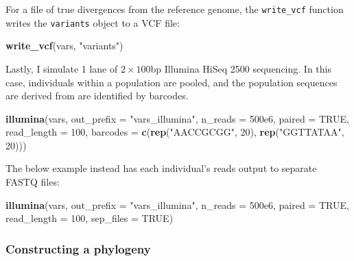 \documentclass[12pt,]{article}
\newenvironment{Shaded}{\begin{snugshade}}{\end{snugshade}}
\newcommand{\DataTypeTok}[1]{\textcolor[rgb]{0.13,0.29,0.53}{#1}}
\newcommand{\DecValTok}[1]{\textcolor[rgb]{0.00,0.00,0.81}{#1}}
\newcommand{\FloatTok}[1]{\textcolor[rgb]{0.00,0.00,0.81}{#1}}
\newcommand{\KeywordTok}[1]{\textcolor[rgb]{0.13,0.29,0.53}{\textbf{#1}}}
\newcommand{\NormalTok}[1]{#1}
\newcommand{\OtherTok}[1]{\textcolor[rgb]{0.56,0.35,0.01}{#1}}
\newcommand{\StringTok}[1]{\textcolor[rgb]{0.31,0.60,0.02}{#1}}
\begin{document}
For a file of true divergences from the reference genome, the \texttt{write\_vcf} function
writes the \texttt{variants} object to a VCF file:

\begin{Shaded}
\begin{Highlighting}[]
\KeywordTok{write_vcf}\NormalTok{(vars, }\StringTok{"variants"}\NormalTok{)}
\end{Highlighting}
\end{Shaded}

Lastly, I simulate 1 lane of \(2 \times 100\)bp Illumina HiSeq 2500 sequencing.
In this case, individuals within a population are pooled, and the population
sequences are derived from are identified by barcodes.

\begin{Shaded}
\begin{Highlighting}[]
\KeywordTok{illumina}\NormalTok{(vars, }\DataTypeTok{out_prefix =} \StringTok{"vars_illumina"}\NormalTok{,}
         \DataTypeTok{n_reads =} \FloatTok{500e6}\NormalTok{, }\DataTypeTok{paired =} \OtherTok{TRUE}\NormalTok{,}
         \DataTypeTok{read_length =} \DecValTok{100}\NormalTok{,}
         \DataTypeTok{barcodes =} \KeywordTok{c}\NormalTok{(}\KeywordTok{rep}\NormalTok{(}\StringTok{"AACCGCGG"}\NormalTok{, }\DecValTok{20}\NormalTok{),}
                      \KeywordTok{rep}\NormalTok{(}\StringTok{"GGTTATAA"}\NormalTok{, }\DecValTok{20}\NormalTok{)))}
\end{Highlighting}
\end{Shaded}

The below example instead has each individual's reads output to separate FASTQ files:

\begin{Shaded}
\begin{Highlighting}[]
\KeywordTok{illumina}\NormalTok{(vars, }\DataTypeTok{out_prefix =} \StringTok{"vars_illumina"}\NormalTok{,}
         \DataTypeTok{n_reads =} \FloatTok{500e6}\NormalTok{, }\DataTypeTok{paired =} \OtherTok{TRUE}\NormalTok{,}
         \DataTypeTok{read_length =} \DecValTok{100}\NormalTok{,}
         \DataTypeTok{sep_files =} \OtherTok{TRUE}\NormalTok{)}
\end{Highlighting}
\end{Shaded}

\hypertarget{constructing-a-phylogeny}{%
\subsubsection{Constructing a phylogeny}\label{constructing-a-phylogeny}}
\end{document}
